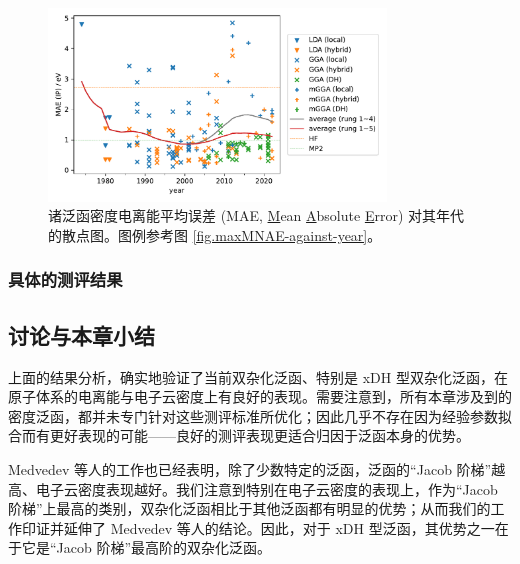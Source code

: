 \begin{figure}[p]
    \centering
    \caption{诸泛函密度电离能平均误差 (MAE, \underline{M}ean \underline{A}bsolute \underline{E}rror) 对其年代的散点图。图例参考图 \ref{fig.maxMNAE-against-year}。}
    \label{fig.MAE-etot-against-year}
    \includegraphics[width=0.8\textwidth]{assets/MAE-etot-against-year.pdf}
\end{figure}

\subsubsection{具体的测评结果}



\subsection{讨论与本章小结}

上面的结果分析，确实地验证了当前双杂化泛函、特别是 xDH 型双杂化泛函，在原子体系的电离能与电子云密度上有良好的表现。需要注意到，所有本章涉及到的密度泛函，都并未专门针对这些测评标准所优化；因此几乎不存在因为经验参数拟合而有更好表现的可能——良好的测评表现更适合归因于泛函本身的优势。

Medvedev 等人的工作也已经表明，除了少数特定的泛函，泛函的“Jacob 阶梯”越高、电子云密度表现越好。我们注意到特别在电子云密度的表现上，作为“Jacob 阶梯”上最高的类别，双杂化泛函相比于其他泛函都有明显的优势；从而我们的工作印证并延伸了 Medvedev 等人的结论。因此，对于 xDH 型泛函，其优势之一在于它是“Jacob 阶梯”最高阶的双杂化泛函。


